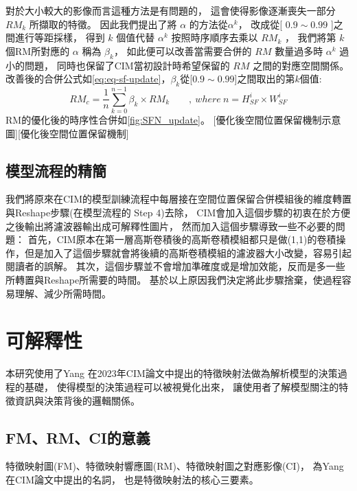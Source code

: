 \documentclass[class=NCU_thesis, crop=false]{standalone}
\begin{document}
	對於大小較大的影像而言這種方法是有問題的，
	這會使得影像逐漸喪失一部分$ RM_{k} $ 所擷取的特徵。
	因此我們提出了將 $\alpha$ 的方法從$\alpha^{k}$，
	改成從[ $0.9 \sim 0.99$ ]之間進行等距採樣，
	得到 $k$ 個值代替 $\alpha^{k}$ 按照時序順序去乘以 $RM_{k}$ ，
	我們將第 $k$ 個RM所對應的 $\alpha$ 稱為 $\beta_{k}$，
	如此便可以改善當需要合併的 $RM$ 數量過多時 $\alpha^{k}$ 過小的問題，
	同時也保留了CIM當初設計時希望保留的 $RM$ 之間的對應空間關係。\\
	改善後的合併公式如\cref{eq:eq-sf-update}，$\beta_{k}$從[$0.9 \sim 0.99$]之間取出的第$k$個值:\\
		\begin{equation}
		    \label{eq:eq-sf-update}
		    RM_{c}=\frac{1}{n} \sum_{k = 0}^{n-1} \beta_{k} \times RM_{k}  \qquad ,\ where\ n = \textit{H}^{i}_{SF} \times \textit{W}^{i}_{SF}
		\end{equation}
	RM的優化後的時序性合併如\cref{fig:SFN_update}。
	[優化後空間位置保留機制示意圖][優化後空間位置保留機制]

	\subsection{模型流程的精簡}

	我們將原來在CIM的模型訓練流程中每層接在空間位置保留合併模組後的維度轉置與Reshape步驟(在\cite{YangCNNInterpretable}模型流程的 Step 4)去除，
	CIM會加入這個步驟的初衷在於方便之後輸出將濾波器輸出成可解釋性圖片，
	然而加入這個步驟導致一些不必要的問題：
	首先，CIM原本在第一層高斯卷積後的高斯卷積模組都只是做(1,1)的卷積操作，但是加入了這個步驟就會將後續的高斯卷積模組的濾波器大小改變，容易引起閱讀者的誤解。
	其次，這個步驟並不會增加準確度或是增加效能，反而是多一些所轉置與Reshape所需要的時間。
	基於以上原因我們決定將此步驟捨棄，使過程容易理解、減少所需時間。


\pagebreak
\section{可解釋性} 
本研究使用了Yang 在2023年CIM論文中提出的特徵映射法做為解析模型的決策過程的基礎，
使得模型的決策過程可以被視覺化出來，
讓使用者了解模型關注的特徵資訊與決策背後的邏輯關係。
	
	\subsection{FM、RM、CI的意義}
	\label{section:InterablePicture}
	特徵映射圖(FM)、特徵映射響應圖(RM)、特徵映射圖之對應影像(CI)，
	為Yang在CIM論文中提出的名詞，
	也是特徵映射法的核心三要素。
\end{document}
